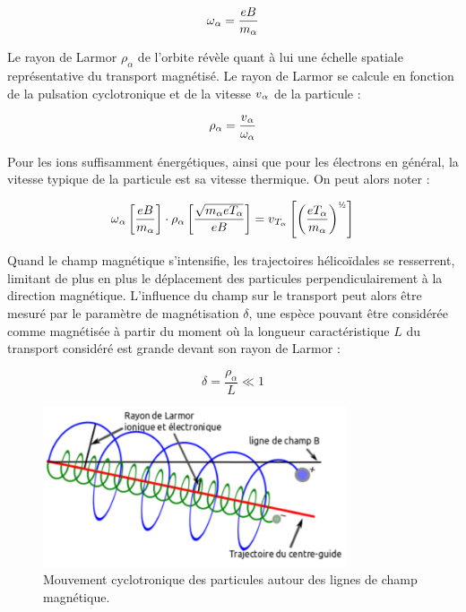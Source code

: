 \begin{refsection}
\begin{equation}
\omega{_{{\alpha}}}=\frac{e B}{m_\alpha}
\end{equation}

Le rayon de Larmor $\rho_\alpha$ de l'orbite révèle quant à lui une
échelle spatiale représentative du transport magnétisé. Le rayon de Larmor se
calcule en fonction de la pulsation cyclotronique et de la vitesse
$v{_{\alpha}}$ de la particule :

\begin{equation}
\rho{_{\alpha}}
=\frac{v{_{\alpha}}}{\omega_{{\alpha}}}
\end{equation}

Pour les ions suffisamment énergétiques, ainsi que pour les électrons en général,
la vitesse typique de la particule est sa vitesse thermique. On peut alors noter :

\begin{equation}
\omega\indice{{\alpha}}\left[\frac{e B}{m_\alpha}\right]
\cdot\rho\indice{{\alpha}}\left[\frac{\sqrt{m_\alpha eT_\alpha}}{eB}\right]
=v\indice{T_{\alpha}}\left[\left(\frac{eT_{\alpha}}{m_{\alpha}}\right)^{\text{\textonehalf}}\right]
\end{equation}

Quand le champ magnétique s'intensifie, les trajectoires
hélicoïdales se resserrent, limitant de plus en plus le déplacement des
particules perpendiculairement à la direction magnétique. L'influence du champ
sur le transport peut alors être mesuré par le paramètre de
magnétisation $\delta$, une espèce pouvant être considérée comme magnétisée à
partir du moment où la longueur caractéristique $L$ du transport considéré est
grande devant son rayon de Larmor :

\begin{equation}
\delta=\frac{\rho_{{\alpha}}}{L}\ll 1
\end{equation}

\begin{figure}[htbp]
\centering
\includegraphics[width=0.8\textwidth]{figures/1-mouvementCyclotron.png}
{\caption{Mouvement cyclotronique des particules autour des lignes de champ
magnétique.}\label{1-particleDrifts}}
\end{figure}


\end{refsection}

